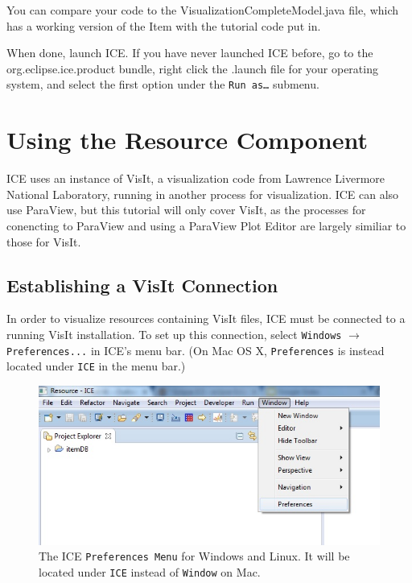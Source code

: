 You can compare your code to the VisualizationCompleteModel.java file, which has
a working version of the Item with the tutorial code put in. 

When done, launch ICE. If you have never launched ICE before, go to the
org.eclipse.ice.product bundle, right click the .launch file for your operating
system, and select the first option under the \texttt{Run as\ldots} submenu.

\section{Using the Resource Component}

ICE uses an instance of VisIt, a visualization code from Lawrence Livermore
National Laboratory, running in another process for visualization. ICE can also
use ParaView, but this tutorial will only cover VisIt, as the processes for
conencting to ParaView and using a ParaView Plot Editor are largely similiar to
those for VisIt.

\subsection{Establishing a VisIt Connection}

In order to visualize resources containing VisIt files, ICE must be connected to
a running VisIt installation. To set up this connection, select \texttt{Windows}
$\rightarrow$ \texttt{Preferences...} in ICE's menu bar. (On Mac OS X,
\texttt{Preferences} is instead located under \texttt{ICE} in the menu
bar.)

\begin{figure}[!h]
\includegraphics[width=12cm]{images/ICEPreferences}
\centering
\caption{The ICE \texttt{Preferences Menu} for Windows and Linux. It will be
located under \texttt{ICE} instead of \texttt{Window} on Mac.}
\label{fig:icepreferences}
\end{figure}


